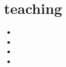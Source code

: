 \section{teaching} 

\begin{small}
\begin{itemize}
\item[\twothousandeleven]
\item[\twothousandfourteen]
\item[\twothousandnineteen] 
\item[\twothousandtwentyone] 
\end{itemize}
\end{small}


